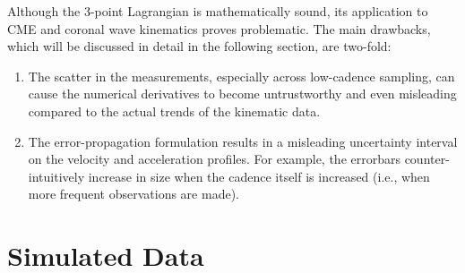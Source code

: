 \documentclass[referee]{aa}
\begin{document}
Although the 3-point Lagrangian is mathematically sound, its application to CME and coronal wave kinematics proves problematic. The main drawbacks, which will be discussed in detail in the following section, are two-fold:
\begin{enumerate}
\item The scatter in the measurements, especially across low-cadence sampling, can cause the numerical derivatives to become untrustworthy and even misleading compared to the actual trends of the kinematic data.
\item The error-propagation formulation results in a misleading uncertainty interval on the velocity and acceleration profiles. For example, the errorbars counter-intuitively increase in size when the cadence itself is increased (i.e., when more frequent observations are made).
\end{enumerate}




\section{Simulated Data}
\label{sect:simul1}
\end{document}

